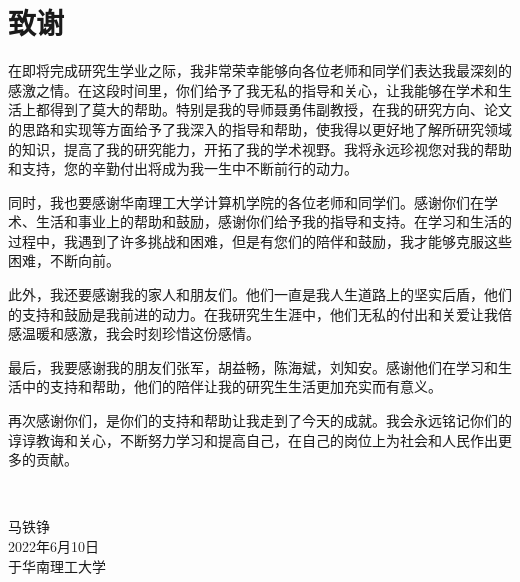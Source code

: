 \chapter{致\texorpdfstring{\quad}{}谢}
在即将完成研究生学业之际，我非常荣幸能够向各位老师和同学们表达我最深刻的感激之情。在这段时间里，你们给予了我无私的指导和关心，让我能够在学术和生活上都得到了莫大的帮助。特别是我的导师聂勇伟副教授，在我的研究方向、论文的思路和实现等方面给予了我深入的指导和帮助，使我得以更好地了解所研究领域的知识，提高了我的研究能力，开拓了我的学术视野。我将永远珍视您对我的帮助和支持，您的辛勤付出将成为我一生中不断前行的动力。

同时，我也要感谢华南理工大学计算机学院的各位老师和同学们。感谢你们在学术、生活和事业上的帮助和鼓励，感谢你们给予我的指导和支持。在学习和生活的过程中，我遇到了许多挑战和困难，但是有您们的陪伴和鼓励，我才能够克服这些困难，不断向前。

此外，我还要感谢我的家人和朋友们。他们一直是我人生道路上的坚实后盾，他们的支持和鼓励是我前进的动力。在我研究生生涯中，他们无私的付出和关爱让我倍感温暖和感激，我会时刻珍惜这份感情。

最后，我要感谢我的朋友们张军，胡益畅，陈海斌，刘知安。感谢他们在学习和生活中的支持和帮助，他们的陪伴让我的研究生生活更加充实而有意义。

再次感谢你们，是你们的支持和帮助让我走到了今天的成就。我会永远铭记你们的谆谆教诲和关心，不断努力学习和提高自己，在自己的岗位上为社会和人民作出更多的贡献。

~\\

\begin{minipage}[t]{0.945\textwidth}%
	\begin{flushright}
		马铁铮\\
		2022年6月10日\\	%
		于华南理工大学
		\par\end{flushright}
\end{minipage}


